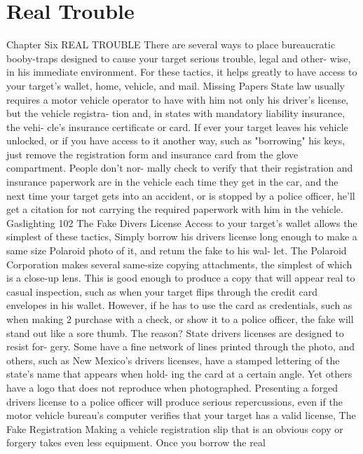 \documentclass{book}
\begin{document}
\chapter{Real Trouble}
Chapter Six 
REAL TROUBLE 
There are several ways to place bureaucratic booby-traps 
designed to cause your target serious trouble, legal and other- 
wise, in his immediate environment. For these tactics, it helps 
greatly to have access to your target's wallet, home, vehicle, and 
mail. 
Missing Papers 
State law usually requires a motor vehicle operator to have 
with him not only his driver's license, but the vehicle registra- 
tion and, in states with mandatory liability insurance, the vehi- 
cle's insurance certificate or card. If ever your target leaves his 
vehicle unlocked, or if you have access to it another way, such 
as "borrowing" his keys, just remove the registration form and 
insurance card from the glove compartment. People don't nor- 
mally check to verify that their registration and insurance 
paperwork are in the vehicle each time they get in the car, and 
the next time your target gets into an accident, or is stopped by 
a police officer, he'll get a citation for not carrying the required 
paperwork with him in the vehicle. 
Gaslighting 
102 
The Fake Divers License 
Access to your target's wallet allows the simplest of these 
tactics, Simply borrow his drivers license long enough to make 
a same size Polaroid photo of it, and retum the fake to his wal- 
let. 
The Polaroid Corporation makes several same-size copying 
attachments, the simplest of which is a close-up lens. This is 
good enough to produce a copy that will appear real to casual 
inspection, such as when your target flips through the credit 
card envelopes in his wallet. However, if he has to use the card 
as credentials, such as when making 2 purchase with a check, 
or show it to a police officer, the fake will stand out like a sore 
thumb. 
The reason? State drivers licenses are designed to resist for- 
gery. Some have a fine network of lines printed through the 
photo, and others, such as New Mexico's drivers licenses, have 
a stamped lettering of the state's name that appears when hold- 
ing the card at a certain angle. Yet others have a logo that does 
not reproduce when photographed. Presenting a forged drivers 
license to a police officer will produce serious repercussions, 
even if the motor vehicle bureau's computer verifies that your 
target has a valid license, 
The Fake Registration 
Making a vehicle registration slip that is an obvious copy or 
forgery takes even less equipment. Once you borrow the real 
\end{document}
